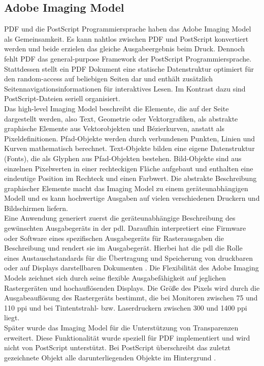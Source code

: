 \subsection{Adobe Imaging Model}
PDF und die PostScript Programmiersprache haben das Adobe Imaging Model als Gemeinsamkeit. Es kann nahtlos zwischen PDF und PostScript konvertiert werden und beide erzielen das gleiche Ausgabeergebnis beim Druck. Dennoch fehlt PDF das general-purpose Framework der PostScript Programmiersprache. Stattdessen stellt ein PDF Dokument eine statische Datenstruktur optimiert für den random-access auf beliebigen Seiten dar und enthält zusätzlich Seitennavigationsinformationen für interaktives Lesen. Im Kontrast dazu sind PostScript-Dateien seriell organisiert. \\
Das high-level Imaging Model beschreibt die Elemente, die auf der Seite dargestellt werden, also Text, Geometrie oder Vektorgrafiken, als abstrakte graphische Elemente aus Vektorobjekten und Bézierkurven, anstatt als Pixeldefinitionen. Pfad-Objekte werden durch verbundenen Punkten, Linien und Kurven mathematisch berechnet. Text-Objekte bilden eine eigene Datenstruktur (Fonts), die als Glyphen aus Pfad-Objekten bestehen. Bild-Objekte sind aus einzelnen Pixelwerten in einer rechteckigen Fläche aufgebaut und enthalten eine eindeutige Position im Rechteck und einen Farbwert. Die abstrakte Beschreibung graphischer Elemente macht das Imaging Model zu einem geräteunabhängigen Modell und es kann hochwertige Ausgaben auf vielen verschiedenen Druckern und Bildschirmen liefern. \\
Eine Anwendung generiert zuerst die geräteunabhängige Beschreibung des gewünschten Ausgabegeräts in der \gls{pdl}. Daraufhin interpretiert eine Firmware oder Software eines spezifischen Ausgabegeräts für Rasterausgaben die Beschreibung und rendert sie im Ausgabegerät. Hierbei hat die \gls{pdl} die Rolle eines Austauschstandards für die Übertragung und Speicherung von druckbaren oder auf Displays darstellbaren Dokumenten \cite{adobe-postscript}. Die Flexibilität des Adobe Imaging Models zeichnet sich durch seine flexible Ausgabefähigkeit auf jeglichen Rastergeräten und hochauflösenden Displays. Die Größe des Pixels wird durch die Ausgabeauflösung des Rastergeräts bestimmt, die bei Monitoren zwischen 75 und 110 \gls{ppi} und bei Tintentstrahl- bzw. Laserdruckern zwischen 300 und 1400 \gls{ppi} liegt. \\
Später wurde das Imaging Model für die Unterstützung von Transparenzen erweitert. Diese Funktionalität wurde speziell für PDF implementiert und wird nicht von PostScript unterstützt. Bei PostScript überschreibt das zuletzt gezeichnete Objekt alle darunterliegenden Objekte im Hintergrund \cite{schneeberger}. 

